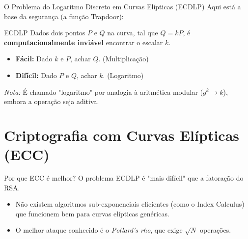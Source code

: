 \documentclass[aspectratio=169]{beamer}
\begin{document}
\begin{frame}{O Problema do Logaritmo Discreto em Curvas Elípticas (ECDLP)}
  Aqui está a base da segurança (a função Trapdoor):
  
  \vspace{0.3cm}
  \begin{block}{ECDLP}
    Dados dois pontos $P$ e $Q$ na curva, tal que $Q = kP$, é \textbf{computacionalmente inviável} encontrar o escalar $k$.
  \end{block}
  
  \begin{itemize}
      \item \textbf{Fácil:} Dado $k$ e $P$, achar $Q$. (Multiplicação)
      \item \textbf{Difícil:} Dado $P$ e $Q$, achar $k$. (Logaritmo)
  \end{itemize}
  
  \textit{Nota:} É chamado "logaritmo" por analogia à aritmética modular ($g^k \to k$), embora a operação seja aditiva.
\end{frame}

\section{Criptografia com Curvas Elípticas (ECC)}

\begin{frame}{Por que ECC é melhor?}
  O problema ECDLP é "mais difícil" que a fatoração do RSA.
  
  \begin{itemize}
      \item Não existem algoritmos sub-exponenciais eficientes (como o Index Calculus) que funcionem bem para curvas elípticas genéricas.
      \item O melhor ataque conhecido é o \textit{Pollard's rho}, que exige $\sqrt{N}$ operações.
  \end{itemize}
\end{frame}
\end{document}
